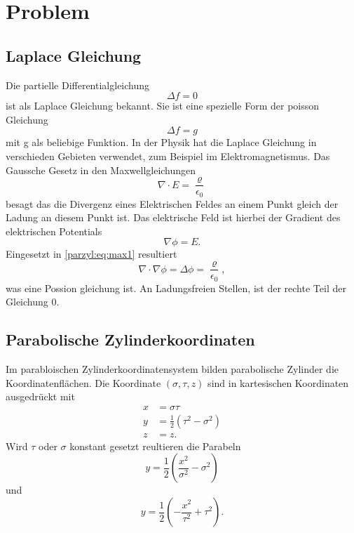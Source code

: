 %
%
%
\section{Problem\label{parzyl:section:teil0}}

\subsection{Laplace Gleichung}
Die partielle Differentialgleichung
\begin{equation}
    \Delta f = 0
\end{equation}
ist als Laplace Gleichung bekannt.
Sie ist eine spezielle Form der poisson Gleichung
\begin{equation}
    \Delta f = g
\end{equation}
mit g als beliebige Funktion.
In der Physik hat die Laplace Gleichung in verschieden Gebieten
verwendet, zum Beispiel im Elektromagnetismus.
Das Gaussche Gesetz in den Maxwellgleichungen 
\begin{equation}
     \nabla \cdot E = \frac{\varrho}{\epsilon_0}
\label{parzyl:eq:max1}
\end{equation}
besagt das die Divergenz eines Elektrischen Feldes an einem 
Punkt gleich der Ladung an diesem Punkt ist.
Das elektrische Feld ist hierbei der Gradient des elektrischen
Potentials
\begin{equation}
    \nabla \phi = E.
\end{equation}
Eingesetzt in \eqref{parzyl:eq:max1} resultiert
\begin{equation}
    \nabla \cdot \nabla \phi = \Delta \phi = \frac{\varrho}{\epsilon_0},
\end{equation}
was eine Possion gleichung ist.
An Ladungsfreien Stellen, ist der rechte Teil der Gleichung $0$. 
\subsection{Parabolische Zylinderkoordinaten
\label{parzyl:subsection:finibus}}
Im parabloischen Zylinderkoordinatensystem bilden parabolische Zylinder die Koordinatenflächen.
Die Koordinate $(\sigma, \tau, z)$ sind in kartesischen Koordinaten ausgedrückt mit
\begin{align}
    x & = \sigma \tau \\
    y & = \frac{1}{2}\left(\tau^2 - \sigma^2\right) \\
    z & = z.
\end{align}
Wird $\tau$ oder $\sigma$ konstant gesetzt reultieren die Parabeln
\begin{equation}
    y = \frac{1}{2} \left( \frac{x^2}{\sigma^2} - \sigma^2 \right)
\end{equation}
und 
\begin{equation}
    y = \frac{1}{2} \left( -\frac{x^2}{\tau^2} + \tau^2 \right).
\end{equation}

